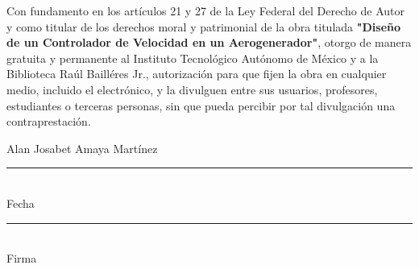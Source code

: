 \documentclass[11pt, oneside]{book} %
\theoremstyle{definition}
\begin{document}
\begin{titlepage}
\thispagestyle{empty}
\vspace*{2cm}

\noindent
Con fundamento en los artículos 21 y 27 de la Ley Federal del Derecho de Autor y como titular de los derechos moral y patrimonial de la obra titulada \textbf{"Diseño de un Controlador de Velocidad en un Aerogenerador"}, otorgo de manera gratuita y permanente al Instituto Tecnológico Autónomo de México y a la Biblioteca Raúl Bailléres Jr., autorización para que fijen la obra en cualquier medio, incluido el electrónico, y la divulguen entre sus usuarios, profesores, estudiantes o terceras personas, sin que pueda percibir por tal divulgación una contraprestación.

\vspace{2cm}

\begin{center}
Alan Josabet Amaya Martínez

\vspace{2cm}
\rule{6cm}{0.4pt}\\
Fecha

\vspace{2cm}
\rule{6cm}{0.4pt}\\
Firma
\end{center}

\end{titlepage}

\tableofcontents %
\mainmatter %







\appendix
%


\renewcommand\bibname{Referencias}


\end{document}
